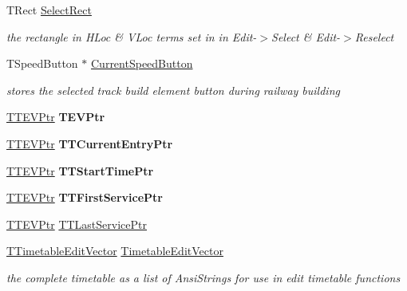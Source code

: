 \begin{DoxyCompactItemize}
\mbox{\label{class_t_interface_a9d71d885781eba14e12a8b2399ec46fd}} 
T\+Rect \mbox{\hyperlink{class_t_interface_a9d71d885781eba14e12a8b2399ec46fd}{Select\+Rect}}
\begin{DoxyCompactList}\small\item\em the rectangle in H\+Loc \& V\+Loc terms set in in Edit-\/$>$Select \& Edit-\/$>$Reselect \end{DoxyCompactList}\item 
\mbox{\label{class_t_interface_a5aad0b6cde6091f55e097cc820310889}} 
T\+Speed\+Button $\ast$ \mbox{\hyperlink{class_t_interface_a5aad0b6cde6091f55e097cc820310889}{Current\+Speed\+Button}}
\begin{DoxyCompactList}\small\item\em stores the selected track build element button during railway building \end{DoxyCompactList}\item 
\mbox{\label{class_t_interface_ac49f5bb89f864087b289c3a94bd96326}} 
\mbox{\hyperlink{class_t_interface_abea77d791c25726e7711356bbc902534}{T\+T\+E\+V\+Ptr}} {\bfseries T\+E\+V\+Ptr}
\item 
\mbox{\label{class_t_interface_a81b12f59c809b59ce90b36707fa34c59}} 
\mbox{\hyperlink{class_t_interface_abea77d791c25726e7711356bbc902534}{T\+T\+E\+V\+Ptr}} {\bfseries T\+T\+Current\+Entry\+Ptr}
\item 
\mbox{\label{class_t_interface_ad47530304b4b550baad3b3b71bdd20b5}} 
\mbox{\hyperlink{class_t_interface_abea77d791c25726e7711356bbc902534}{T\+T\+E\+V\+Ptr}} {\bfseries T\+T\+Start\+Time\+Ptr}
\item 
\mbox{\label{class_t_interface_adba29bf383d93b11cb8a99ec76d36be7}} 
\mbox{\hyperlink{class_t_interface_abea77d791c25726e7711356bbc902534}{T\+T\+E\+V\+Ptr}} {\bfseries T\+T\+First\+Service\+Ptr}
\item 
\mbox{\hyperlink{class_t_interface_abea77d791c25726e7711356bbc902534}{T\+T\+E\+V\+Ptr}} \mbox{\hyperlink{class_t_interface_aae335c69e96b9210f28225f562e50c4d}{T\+T\+Last\+Service\+Ptr}}
\item 
\mbox{\label{class_t_interface_a0a8913634322bedba0e8e9e5e16ba181}} 
\mbox{\hyperlink{class_t_interface_abf0434fbaa193f8f7594977f6e88f006}{T\+Timetable\+Edit\+Vector}} \mbox{\hyperlink{class_t_interface_a0a8913634322bedba0e8e9e5e16ba181}{Timetable\+Edit\+Vector}}
\begin{DoxyCompactList}\small\item\em the complete timetable as a list of Ansi\+Strings for use in edit timetable functions \end{DoxyCompactList}\end{DoxyCompactItemize}
